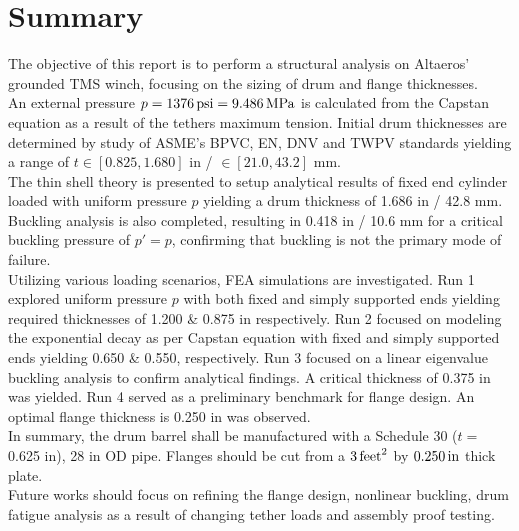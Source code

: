 \chapter{Summary}

The objective of this report is to perform a structural analysis on Altaeros' grounded TMS winch, focusing on the sizing of drum and flange thicknesses.\\

An external pressure $p=1376\,\mathrm{psi}= 9.486\,\mathrm{MPa}$ is calculated from the Capstan equation as a result of the tethers maximum tension. Initial drum thicknesses are determined by study of ASME's BPVC, EN, DNV and TWPV standards yielding a range of $t\in [0.825, 1.680]$ in / $\in [21.0, 43.2]$ mm.\\

The thin shell theory is presented to setup analytical results of fixed end cylinder loaded with uniform pressure $p$ yielding a drum thickness of 1.686 in / 42.8 mm. Buckling analysis is also completed, resulting in 0.418 in / 10.6 mm for a critical buckling pressure of $p'=p$, confirming that buckling is not the primary mode of failure.\\

Utilizing various loading scenarios, FEA simulations are investigated. Run 1 explored uniform pressure $p$ with both fixed and simply supported ends yielding required thicknesses of 1.200 \& 0.875 in respectively. Run 2 focused on modeling the exponential decay as per Capstan equation with fixed and simply supported ends yielding 0.650 \& 0.550, respectively. Run 3 focused on a linear eigenvalue buckling analysis to confirm analytical findings. A critical thickness of 0.375 in was yielded. Run 4 served as a preliminary benchmark for flange design. An optimal flange thickness is 0.250 in was observed.\\

In summary, the drum barrel shall be manufactured with a Schedule 30 ($t=$ 0.625 in), 28 in OD pipe. Flanges should be cut from a $3\,\mathrm{feet}^2$ by $0.250\,\mathrm{in}$ thick plate.\\

Future works should focus on refining the flange design, nonlinear buckling, drum fatigue analysis as a result of changing tether loads and assembly proof testing.